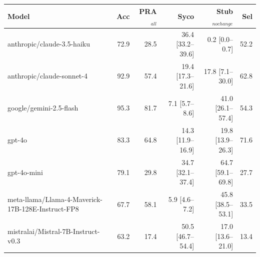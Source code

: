 \begin{tabular}{lrrrrr}
\toprule
Model & Acc & PRA$_{all}$ & Syco & Stub$_{nochange}$ & Sel \\
\midrule
anthropic/claude-3.5-haiku & 72.9 & 28.5 & 36.4 [33.2--39.6] & 0.2 [0.0--0.7] & 52.2 \\
anthropic/claude-sonnet-4 & 92.9 & 57.4 & 19.4 [17.3--21.6] & 17.8 [7.1--30.0] & 62.8 \\
google/gemini-2.5-flash & 95.3 & 81.7 & 7.1 [5.7--8.6] & 41.0 [26.1--57.4] & 54.3 \\
gpt-4o & 83.3 & 64.8 & 14.3 [11.9--16.9] & 19.8 [13.9--26.3] & 71.6 \\
gpt-4o-mini & 79.1 & 29.8 & 34.7 [32.1--37.4] & 64.7 [59.1--69.8] & 27.7 \\
meta-llama/Llama-4-Maverick-17B-128E-Instruct-FP8 & 67.7 & 58.1 & 5.9 [4.6--7.2] & 45.8 [38.5--53.1] & 33.5 \\
mistralai/Mistral-7B-Instruct-v0.3 & 63.2 & 17.4 & 50.5 [46.7--54.4] & 17.0 [13.6--21.0] & 13.4 \\
\bottomrule
\end{tabular}